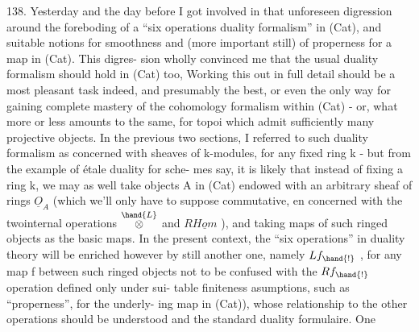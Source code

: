 138. Yesterday and the day before\hand{,} I got involved  in that
unforeseen digression\deleted{\unsure{,}} around the foreboding of a ``six operations
duality formalism'' in (Cat), and suitable notions for smoothness and
(more important still) of properness for a map in (Cat). This digres-%
sion wholly convinced me that the usual duality formalism should hold
in (Cat) too, Working this out in full detail should be a most pleasant
task indeed, and presumably the best, or even the only way for gaining
complete mastery of the cohomology formalism within (Cat) - or, what
more or less amounts to the same, for topoi which admit sufficiently
many projective objects. In the previous two sections, I referred to
such duality formalism as concerned with sheaves of k-modules, for any
fixed ring k - but from the example of étale duality  for sche-%
mes say, it is likely that instead of fixing a ring k, we may as
well take objects A in (Cat) endowed with an arbitrary sheaf of rings
$\underline{O}_{A}$ (which we'll only have to suppose commutative, en concerned with
the two\hand{\unsure{,}}internal operations $\overset{\hand{L}}{\otimes}$ and $R\underline{Hom}$ ), and taking maps of such
ringed objects as the basic maps. In the present context, the ``six
operations'' in duality theory will be enriched however by still another
\margin{! $\times$} one, namely $Lf_{\hand{!}}$ ,  for any map f between such ringed objects\deleted{\unsure{,}}
\hand{(}not to be confused with the $Rf_{\hand{!}}$ operation\hand{,} \deleted{(}defined only under sui-%
table finiteness asumptions, such as ``properness'', for the underly-%
ing map in (Cat)), whose relationship to the other operations should
be understood and   the standard duality formulaire. One


